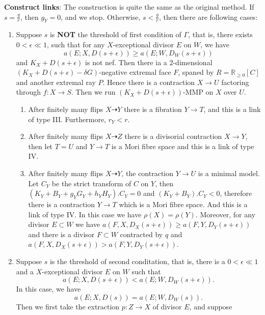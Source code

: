 \documentclass{article}
\begin{document}
\textbf{Construct links}: The construction is quite the same as the original method. If $s=\frac{g}{r}$, then $g_{Y}=0$, and we stop. Otherwise, $s<\frac{g}{r}$, then there are following cases:
\begin{enumerate}[A]
  \item\label{2a} Suppose $s$ is \textbf{NOT} the threshold of first condition of $\Gamma$, that is, there exists $0<\epsilon\ll 1$, such that for any $X$-exceptional divisor $E$ on $W$, we have
    \[
      a(E;X,D(s+\epsilon))\geqslant a(E;W,D_{W}(s+\epsilon))
    \]
    and $K_{X}+D(s+\epsilon)$ is not nef. Then there ia a $2$-dimensional $(K_{X}+D(s+\epsilon)-\delta G)$-negative extremal face $F$, spaned by $R=\mathbb{R}_{\geqslant 0}[C]$ and another extremal ray $P$. Hence there is a contraction $X\to U$ factoring through $f:X\to S$. Then we run $(K_{X}+D(s+\epsilon))$-MMP on $X$ over $U$.
    \begin{enumerate}[1]
    \item\label{2a1}After finitely many flips $X\dashrightarrow Y$ there is a fibration $Y\to T$, and this is a link of type III. Furthermore, $r_{Y}<r$.
    \item\label{2a2} After finitely many flips $X\dashrightarrow Z$ there is a divisorial contraction $X\to Y$, then let $T=U$ and $Y\to T$ is a Mori fibre space and this is a link of type IV.
    \item \label{2a3}After finitely many flips $X\dashrightarrow Y$,  the contraction $Y\to U$ is a minimal model. Let  $C_{Y}$ be the strict transform of  $C$ on $Y$, then $(K_{Y}+B_{Y}+g_{Y}G_{Y}+h_{Y}H_{Y}).C_{Y}=0$ and $(K_{Y}+B_{Y}).C_{Y}<0$, therefore there is a contraction  $Y \to T$ which is a Mori fibre space. And this is a link of type IV. In this case we have $\rho(X)=\rho(Y)$. Moreover, for any divisor $E \subset  W$ we have $a(F,X,D_{X}(s+\epsilon))\geqslant a(F,Y,D_{Y}(s+\epsilon))$ and there is a divisor $F \subset W$ contracted by $q$ and $a(F,X,D_{X}(s+\epsilon))>a(F,Y,D_{Y}(s+\epsilon))$. 
    \end{enumerate}
  \item\label{2b} Suppose $s$ is the threshold of second conditation, that is, there is a $0<\epsilon \ll 1$ and a $X$-exceptional divisor $E$ on $W$ such that 
    \[
      a(E;X,D(s+\epsilon))< a(E;W,D_{W}(s+\epsilon))
    .\]
   In this case, we have 
    \[
      a(E;X,D(s))= a(E;W,D_{W}(s))
    .\]
    Then we first take the extraction $p:Z\to X$ of divisor $E$, and suppose

\end{enumerate}
\end{document}
